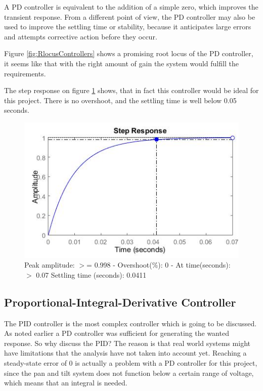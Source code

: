 A PD controller is equivalent to the addition of a simple zero, which improves the transient response. From a different point of view, the PD controller may also be used to improve the settling time or stability, because it anticipates large errors and attempts corrective action before they occur. 

Figure \ref{fig:RlocusControllers} shows a promising root locus of the PD controller, it seems like that with the right amount of gain the system would fulfill the requirements.

The step response on figure \ref{fig:PDStep} shows, that in fact this controller would be ideal for this project. There is no overshoot, and the settling time is well below 0.05 seconds.

\begin{figure}[h!]
\centering
\includegraphics[scale=0.7]{Billeder/PDStep.jpg}
\caption{ Peak amplitude: $>$= 0.998 - Overshoot(\%): 0 - At time(seconds): $>$ 0.07
		 Settling time (seconds): 0.0411 }
\label{fig:PDStep}
\end{figure}

\subsection{Proportional-Integral-Derivative Controller}

The PID controller is the most complex controller which is going to be discussed. As noted earlier a PD controller was sufficient for generating the wanted response. So why discuss the PID? The reason is that real world systems might have limitations that the analysis have not taken into account yet. Reaching a steady-state error of 0 is actually a problem with a PD controller for this project, since the pan and tilt system does not function below a certain range of voltage, which means that an integral is needed.\par

